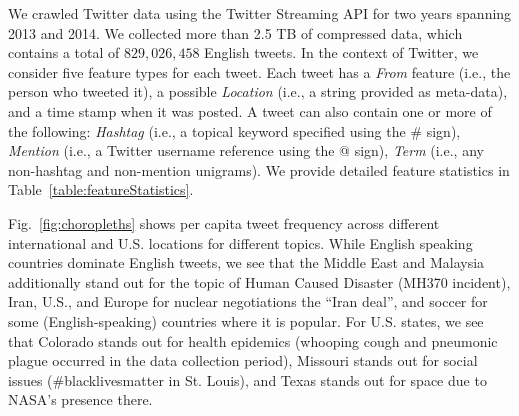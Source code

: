 
We crawled Twitter data using the Twitter 
Streaming API for two years spanning 2013 and 2014.
We collected more than 2.5 TB of compressed data, which contains a total  
of $829,026,458$ English tweets. In the context 
of Twitter, we consider five feature types for each tweet.  Each
tweet has a \textit{From} feature (i.e., the person who tweeted it), a
possible \textit{Location} (i.e., a string provided as meta-data), and
a time stamp when it was posted.  A tweet can also contain one or more
of the following:
\textit{Hashtag} (i.e., a topical keyword specified using the \# sign), 
\textit{Mention} (i.e., a Twitter username reference using the @ sign), %
\textit{Term} (i.e., any non-hashtag and non-mention unigrams). %
We provide detailed feature statistics in Table~\ref{table:featureStatistics}.  

Fig.~\ref{fig:choropleths} shows per capita tweet frequency across
different international and U.S. locations for different topics.
While English speaking countries dominate English tweets, we see that
the Middle East and Malaysia additionally stand out for the topic of
Human Caused Disaster (MH370 incident), Iran, U.S., and Europe for nuclear
negotiations the ``Iran deal'', and soccer for some (English-speaking)
countries where it is popular.  For U.S. states, we see that Colorado
stands out for health epidemics (whooping cough and pneumonic
plague occurred in the data collection period), 
Missouri stands out for social issues (\#blacklivesmatter in
St. Louis), and Texas stands out for space due to NASA's presence
there.


